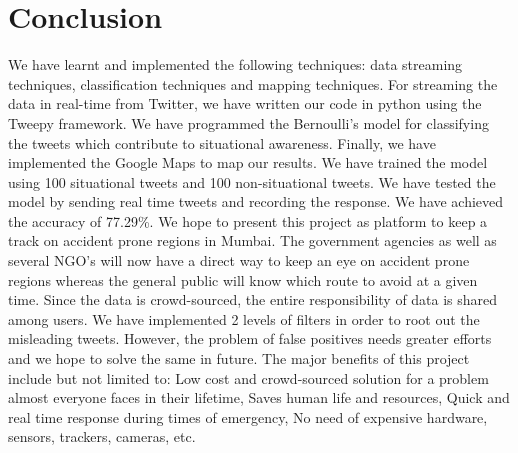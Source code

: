 \documentclass[journal]{IEEEtran}
\begin{document}
\section{Conclusion}
We have learnt and implemented the following techniques: data streaming techniques, classification techniques and mapping techniques. For streaming the data in real-time from Twitter, we have written our code in python using the Tweepy framework. We have programmed the Bernoulli's model for classifying the tweets which contribute to situational awareness. Finally, we have implemented the Google Maps to map our results. We have trained the model using 100 situational tweets and 100 non-situational tweets. We have tested the model by sending real time tweets and recording the response. We have achieved the accuracy of 77.29\%.\newline
We hope to present this project as platform to keep a track on accident prone regions in Mumbai. The government agencies as well as several NGO's will now have a direct way to keep an eye on accident prone regions whereas the general public will know which route to avoid at a given time. Since the data is crowd-sourced, the entire responsibility of data is shared among users. We have implemented 2 levels of filters in order to root out the misleading tweets. However, the problem of false positives needs greater efforts and we hope to solve the same in future. The major benefits of this project include but not limited to: Low cost and crowd-sourced solution for a problem almost everyone faces in their lifetime, Saves human life and resources, Quick and real time response during times of emergency, No need of expensive hardware, sensors, trackers, cameras, etc.

%
%
\end{document}
